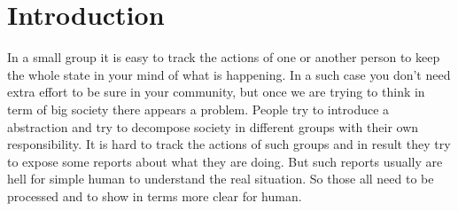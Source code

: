 \documentclass[12pt,a4paper,titlepage]{article}
\begin{document}
\restoregeometry


\newpage
{}
\setcounter{page}{10}
\listoftables
\newpage
{}
\listoffigures
\newpage
{}
\lstlistoflistings
\cleardoublepage


{}

\section*{Introduction}

	In a small group it is easy to track the actions of one or another person to keep the whole state in your mind of what is happening. In a such case you don't need extra effort to be sure in your community, but once we are trying to think in term of big society there appears a problem. People try to introduce a abstraction and try to decompose society in different groups with their own responsibility. It is hard to track the actions of such groups and in result they try to expose some reports about what they are doing. But such reports usually are hell for simple human to understand the real situation. So those all need to be processed and to show in terms more clear for human.\\
\end{document}
